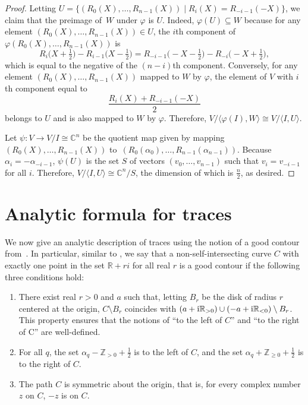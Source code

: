 \documentclass[pdftex]{sigma}
\newcommand\ZZ{\mathbb{Z}}
\newcommand\RR{\mathbb{R}}
\newcommand\CC{\mathbb{C}}
\newcommand\half{\ensuremath{\frac{1}{2}}}
\newcommand\thalf{\ensuremath{\tfrac12}}
\numberwithin{equation}{section}
\theoremstyle{definition}
\begin{document}
\begin{proof}
 Letting
$
 U = \{ (R_0 (X), \dots, R_{n - 1} (X))
 \mid R_i (X) = R_{-i - 1} (-X) \}$,
 we claim that the preimage of~$W$ under $\varphi$ is $U$.
 Indeed, $\varphi(U) \subseteq W$
 because for any element $(R_0 (X), \dots, R_{n - 1} (X)) \in U$,
 the $i$th component of $\varphi(R_0 (X), \dots, R_{n - 1} (X))$
 is \[R_i \bigl(X + \thalf\bigr) - R_{i - 1} \bigl(X - \thalf\bigr)
 = R_{-i - 1} \bigl(-X - \thalf\bigr) - R_{-i} \bigl(-X + \thalf\bigr),\]
 which is equal to the negative of the $(n - i)$th component.
 Conversely, for any
 element $(R_0 (X), \allowbreak\dots, R_{n - 1} (X))$
 mapped to $W$ by $\varphi$,
 the element of $V$ with $i$th component equal to
 \[
 \frac{R_i (X) + R_{-i - 1} (-X)}{2}
 \] belongs to $U$
 and is also mapped to $W$ by $\varphi$.
 Therefore,
$V / \langle \varphi(I), W \rangle
 \cong V / \langle I, U \rangle$.

 Let $\psi \colon V \to V / I \cong \CC^n$ be the quotient map given by
 mapping $(R_0(X), \dots, R_{n - 1}(X))$
 to~$(R_0(\alpha_0), \dots, R_{n - 1}(\alpha_{n - 1}))$.
 Because $\alpha_i = -\alpha_{-i - 1}$,
 $\psi(U)$ is the set $S$ of vectors $(v_0, \dots, v_{n - 1})$
 such that $v_i = v_{-i - 1}$ for all $i$.
 Therefore,
$ V / \langle I, U \rangle \cong \CC^n / S$,
 the dimension of which is $\frac{n}{2}$,
 as desired.
\end{proof}

\section{Analytic formula for traces}
\label{sec:analytic_form}

We now give an analytic description of traces
using the notion of a good contour from~\cite{klyuev2023unitarizability}.
In particular, similar to \cite[Definition~3.6]{klyuev2023unitarizability},
we say that a non-self-intersecting curve $C$
with exactly one point in the set $\RR + ri$ for all real $r$
is a good contour if the following three conditions hold:%
\begin{enumerate}\itemsep=0pt
 \item[$(1)$] There exist real $r > 0$ and $a$ such that,
 letting $B_r$ be the disk of radius $r$ centered at the origin,
 $C \setminus B_r$ coincides with
 $(a + {\rm i}\RR_{>0}) \cup (-a + {\rm i}\RR_{<0}) \setminus B_r$.
 This property ensures that the notions of
 ``to the left of $C$'' and ``to the right of C''
 are well-defined.
 \item[$(2)$] For all $q$,
 the set $\alpha_q - \ZZ_{> 0} + \half$ is to the left of $C$,
 and the set $\alpha_q + \ZZ_{\geq 0} + \half$
 is to the right of $C$.
 \item[$(3)$] The path $C$ is symmetric about the origin,
 that is,
 for every complex number $z$ on $C$,
 $-z$ is on $C$.
\end{enumerate}
\end{document}
